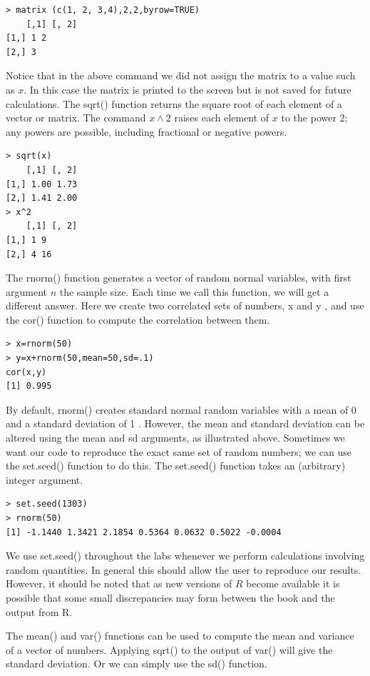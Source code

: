 \documentclass[10pt]{article}
\begin{document}
\begin{verbatim}
> matrix (c(1, 2, 3,4),2,2,byrow=TRUE)
    [,1] [, 2]
[1,] 1 2
[2,] 3
\end{verbatim}

Notice that in the above command we did not assign the matrix to a value such as $x$. In this case the matrix is printed to the screen but is not saved for future calculations. The sqrt() function returns the square root of each element of a vector or matrix. The command $x \wedge 2$ raises each element of $x$ to the power 2; any powers are possible, including fractional or negative powers.

\begin{verbatim}
> sqrt(x)
    [,1] [, 2]
[1,] 1.00 1.73
[2,] 1.41 2.00
> x^2
    [,1] [, 2]
[1,] 1 9
[2,] 4 16
\end{verbatim}

The rnorm() function generates a vector of random normal variables, with first argument $n$ the sample size. Each time we call this function, we will get a different answer. Here we create two correlated sets of numbers, x and y , and use the cor() function to compute the correlation between them.

\begin{verbatim}
> x=rnorm(50)
> y=x+rnorm(50,mean=50,sd=.1)
cor(x,y)
[1] 0.995
\end{verbatim}

By default, rnorm() creates standard normal random variables with a mean of 0 and a standard deviation of 1 . However, the mean and standard deviation can be altered using the mean and sd arguments, as illustrated above. Sometimes we want our code to reproduce the exact same set of random numbers; we can use the set.seed() function to do this. The set.seed() function takes an (arbitrary) integer argument.

\begin{verbatim}
> set.seed(1303)
> rnorm(50)
[1] -1.1440 1.3421 2.1854 0.5364 0.0632 0.5022 -0.0004
\end{verbatim}

We use set.seed() throughout the labs whenever we perform calculations involving random quantities. In general this should allow the user to reproduce our results. However, it should be noted that as new versions of $R$ become available it is possible that some small discrepancies may form between the book and the output from R.

The mean() and var() functions can be used to compute the mean and variance of a vector of numbers. Applying sqrt() to the output of var() will give the standard deviation. Or we can simply use the sd() function.
\end{document}
